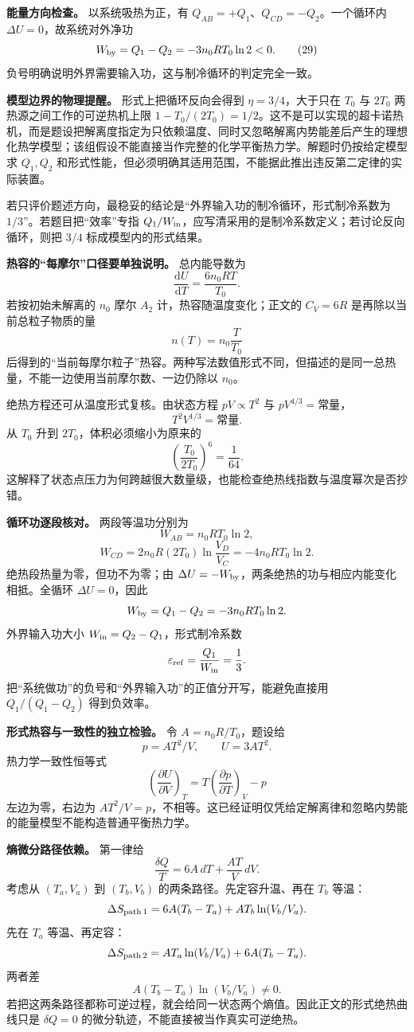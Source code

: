 \documentclass[12pt,a4paper,UTF8]{ctexart}
\begin{document}
\textbf{能量方向检查。} 以系统吸热为正，有
\(Q_{AB}=+Q_1\)、\(Q_{CD}=-Q_2\)。一个循环内
\(\Delta U=0\)，故系统对外净功 \[
W_{\rm by}=Q_1-Q_2=-3n_0RT_0\ln2<0. \tag{29}
\] 负号明确说明外界需要输入功，这与制冷循环的判定完全一致。

\textbf{模型边界的物理提醒。} 形式上把循环反向会得到
\(\eta=3/4\)，大于只在 \(T_0\) 与 \(2T_0\) 两热源之间工作的可逆热机上限
\(1-T_0/(2T_0)=1/2\)。这不是可以实现的超卡诺热机，而是题设把解离度指定为只依赖温度、同时又忽略解离内势能差后产生的理想化热学模型；该组假设不能直接当作完整的化学平衡热力学。解题时仍按给定模型求
\(Q_1,Q_2\)
和形式性能，但必须明确其适用范围，不能据此推出违反第二定律的实际装置。

若只评价题述方向，最稳妥的结论是``外界输入功的制冷循环，形式制冷系数为
\(1/3\)''。若题目把``效率''专指
\(Q_1/W_{\rm in}\)，应写清采用的是制冷系数定义；若讨论反向循环，则把
\(3/4\) 标成模型内的形式结果。

\textbf{热容的``每摩尔''口径要单独说明。} 总内能导数为 \[
\frac{\mathrm dU}{\mathrm dT}
=\frac{6n_0RT}{T_0}.
\] 若按初始未解离的 \(n_0\) 摩尔 \(A_2\) 计，热容随温度变化；正文的
\(C_V=6R\) 是再除以当前总粒子物质的量 \[
n(T)=n_0\frac{T}{T_0}
\]
后得到的``当前每摩尔粒子''热容。两种写法数值形式不同，但描述的是同一总热量，不能一边使用当前摩尔数、一边仍除以
\(n_0\)。

绝热方程还可从温度形式复核。由状态方程 \(pV\propto T^2\) 与
\(pV^{4/3}=\text{常量}\)， \[
T^2V^{1/3}=\text{常量}.
\] 从 \(T_0\) 升到 \(2T_0\)，体积必须缩小为原来的 \[
\left(\frac{T_0}{2T_0}\right)^6=\frac1{64}.
\]
这解释了状态点压力为何跨越很大数量级，也能检查绝热线指数与温度幂次是否抄错。

\textbf{循环功逐段核对。} 两段等温功分别为 \[
W_{AB}=n_0RT_0\ln2,
\] \[
W_{CD}=2n_0R(2T_0)\ln\frac{V_D}{V_C}
=-4n_0RT_0\ln2.
\] 绝热段热量为零，但功不为零；由
\(\Delta U=-W_{\rm by}\)，两条绝热的功与相应内能变化相抵。全循环
\(\Delta U=0\)，因此 \[
W_{\rm by}=Q_1-Q_2
=-3n_0RT_0\ln2.
\] 外界输入功大小 \(W_{\rm in}=Q_2-Q_1\)，形式制冷系数 \[
\varepsilon_{\rm ref}
=\frac{Q_1}{W_{\rm in}}
=\frac13.
\] 把``系统做功''的负号和``外界输入功''的正值分开写，能避免直接用
\(Q_1/(Q_1-Q_2)\) 得到负效率。

\textbf{形式热容与一致性的独立检验。} 令 \(A=n_0R/T_0\)，题设给 \[
p=AT^2/V,\qquad U=3AT^2.
\] 热力学一致性恒等式 \[
\left(\frac{\partial U}{\partial V}\right)_T
=T\left(\frac{\partial p}{\partial T}\right)_V-p
\] 左边为零，右边为
\(AT^2/V=p\)，不相等。这已经证明仅凭给定解离律和忽略内势能的能量模型不能构造普通平衡热力学。

\textbf{熵微分路径依赖。} 第一律给 \[
\frac{\delta Q}{T}=6A\,dT+\frac{AT}{V}\,dV.
\] 考虑从 \((T_a,V_a)\) 到 \((T_b,V_b)\) 的两条路径。先定容升温、再在
\(T_b\) 等温： \[
\Delta S_{\rm path\,1}=6A(T_b-T_a)+AT_b\ln(V_b/V_a).
\] 先在 \(T_a\) 等温、再定容： \[
\Delta S_{\rm path\,2}=AT_a\ln(V_b/V_a)+6A(T_b-T_a).
\] 两者差 \[
A(T_b-T_a)\ln(V_b/V_a)\ne0.
\]
若把这两条路径都称可逆过程，就会给同一状态两个熵值。因此正文的形式绝热曲线只是
\(\delta Q=0\) 的微分轨迹，不能直接被当作真实可逆绝热。
\end{document}
